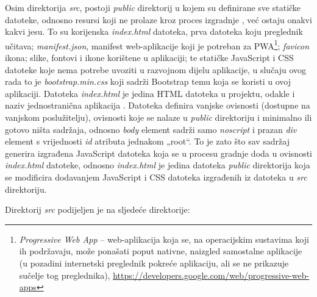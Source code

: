 \documentclass[times, utf8, diplomski, numeric]{fer}
\newcommand{\razmakp}{\vspace{18pt}}
\begin{document}
\razmakp

Osim direktorija \emph{src}, postoji \emph{public} direktorij u kojem su definirane sve statičke datoteke, odnosno resursi koji ne prolaze kroz proces izgradnje , već ostaju onakvi kakvi jesu.
To su korijenska \emph{index.html} datoteka, prva datoteka koju preglednik učitava; \emph{manifest.json}, manifest web-aplikacije koji je potreban za PWA\footnote{
    \emph{Progressive Web App} -- web-aplikacija koja se, na operacijskim sustavima koji ih podržavaju, može ponašati poput nativne, naizgled samostalne aplikacije (u pozadini internetski preglednik pokreće aplikaciju, ali se ne prikazuje sučelje tog preglednika), \url{https://developers.google.com/web/progressive-web-apps}
}; \emph{favicon} ikona; slike, fontovi i ikone korištene u aplikaciji; te statičke JavaScript i CSS datoteke koje nema potrebe uvoziti u razvojnom dijelu aplikacije, u slučaju ovog rada to je \emph{bootstrap.min.css} koji sadrži Bootstrap temu koja se koristi u ovoj aplikaciji.
Datoteka \emph{index.html} je jedina HTML datoteka u projektu, odakle i naziv jednostranična aplikacija .
Datoteka definira vanjske ovisnosti (dostupne na vanjskom poslužitelju), ovisnosti koje se nalaze u \emph{public} direktoriju i minimalno ili gotovo ništa sadržaja, odnosno \emph{body} element sadrži samo \emph{noscript} i prazan \emph{div} element s vrijednosti \emph{id} atributa jednakom „root“.
To je zato što sav sadržaj generira izgrađena JavaScript datoteka koja se u procesu gradnje doda u ovisnosti \emph{index.html} datoteke, odnosno \emph{index.html} je jedina datoteka \emph{public} direktorija koja se modificira dodavanjem JavaScript i CSS datoteka izgrađenih iz datoteka u \emph{src} direktoriju.

\razmakp

\noindent Direktorij \emph{src} podijeljen je na sljedeće direktorije:
\end{document}

